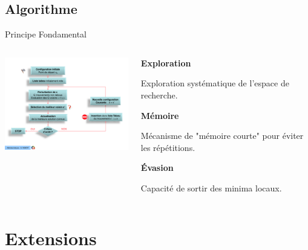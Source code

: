 \documentclass{beamer}
\begin{document}
\subsection{Algorithme}
\begin{frame}{Principe Fondamental}

    \begin{columns}[T] %
        \begin{column}{0.6\textwidth}
            \raggedright
            \includegraphics[width=7cm]{Docs_RT1.pdf}
        \end{column}

        \begin{column}{0.4\textwidth}

            \textbf{Exploration}
            \medskip

            Exploration systématique de l'espace de recherche. \medskip

            \textbf{Mémoire}
            \medskip

            Mécanisme de "mémoire courte" pour éviter les répétitions. \medskip

            \textbf{Évasion}
            \medskip

            Capacité de sortir des minima locaux.

        \end{column}
    \end{columns}
\end{frame}

\section{Extensions}
\end{document}
